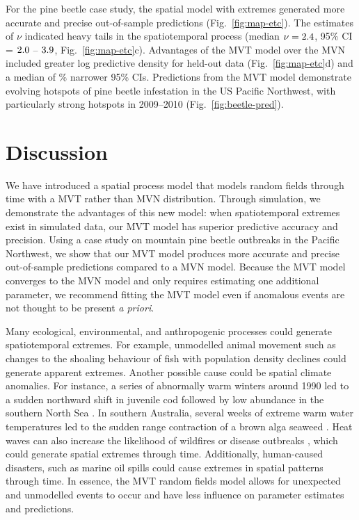 \documentclass[12pt,english]{article}
\begin{document}
\begin{spacing}{1.8}
For the pine beetle case study, the spatial model with extremes generated more
accurate and precise out-of-sample predictions (Fig.~\ref{fig:map-etc}). The
estimates of $\nu$ indicated heavy tails in the spatiotemporal process (median
$\nu = 2.4$, 95\% CI = $2.0$ -- $3.9$,
Fig.~\ref{fig:map-etc}c). Advantages of the MVT model over the MVN included
greater log predictive density for held-out data (Fig.~\ref{fig:map-etc}d)
and a median of \medianPercSmallerCIsBeetles \% narrower 95\% CIs. Predictions
from the MVT model demonstrate evolving hotspots of pine beetle infestation in
the US Pacific Northwest, with particularly strong hotspots in 2009--2010
(Fig.~\ref{fig:beetle-pred}).


\section{Discussion}

We have introduced a spatial process model that models random fields through
time with a MVT rather than MVN distribution. Through simulation, we demonstrate
the advantages of this new model: when spatiotemporal extremes exist in
simulated data, our MVT model has superior predictive accuracy and precision.
Using a case study on mountain pine beetle outbreaks in the Pacific Northwest,
we show that our MVT model produces more accurate and precise out-of-sample
predictions compared to a MVN model. Because the MVT model converges to the MVN
model and only requires estimating one additional parameter, we recommend
fitting the MVT model even if anomalous events are not thought to be present
\textit{a priori}.

Many ecological, environmental, and anthropogenic processes could generate
spatiotemporal extremes. For example, unmodelled animal movement such as changes
to the shoaling behaviour of fish with population density declines
\citep[][]{rose1999} could generate apparent extremes. Another possible cause
could be spatial climate anomalies. For instance, a series of abnormally warm
winters around 1990 led to a sudden northward shift in juvenile cod followed by low
abundance in the southern North Sea \citep{rindorf2006}. In southern
Australia, several weeks of extreme warm water temperatures led to the sudden
range contraction of a brown alga seaweed \citep{smale2013}. Heat waves can also
increase the likelihood of wildfires or disease outbreaks
\citep[e.g.][]{harvell2002}, which could generate spatial extremes through time.
Additionally, human-caused disasters, such as marine oil spills could cause
extremes in spatial patterns through time. In essence, the MVT random fields
model allows for unexpected and unmodelled events to occur and have less
influence on parameter estimates and predictions.


\end{spacing}
\end{document}
